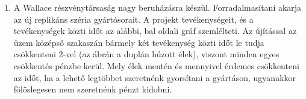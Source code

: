 \documentclass[a4paper,12pt]{article}
\begin{document}
\begin{enumerate}
\begin{table}[h]
\begin{tabular}{|c|c|c|c|c|c|}
            \end{tabular}
        \end{table}

        \item A Wallace részvénytársaság nagy beruházásra készül. Forradalmasítani akarja az új replikáns széria gyártósorait. A projekt tevékenységeit, és a tevékenységek közti időt az alábbi, bal oldali gráf szemlélteti. Az újítással az üzem középső szakaszán bármely két tevékenység közti időt le tudja csökkenteni $2$-vel (az ábrán a duplán húzott élek), viszont minden egyes csökkentés pénzbe kerül. Mely élek mentén és mennyivel érdemes csökkenteni az időt, ha a lehető legtöbbet szeretnénk gyorsítani a gyártáson, ugyanakkor fölöslegesen nem szeretnénk pénzt kidobni.
        \begin{figure}[h]
            \centering
            
        \end{figure}
    \end{enumerate}
\end{document}
